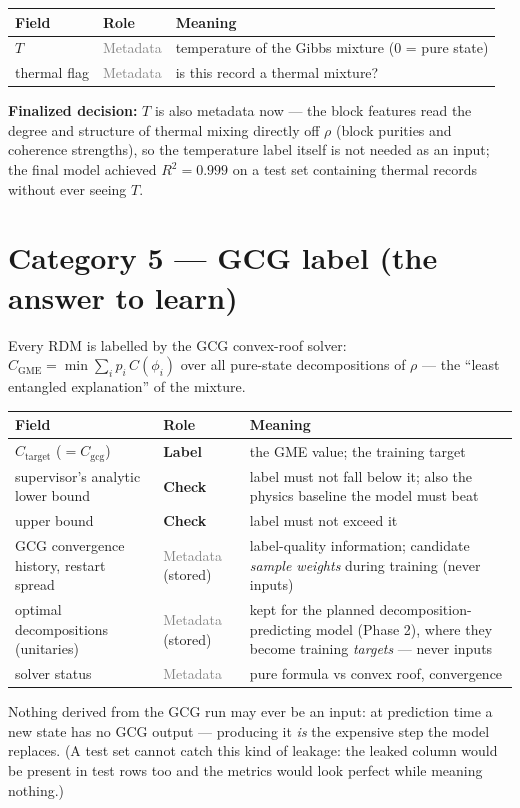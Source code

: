 \documentclass[11pt]{article}
\newcommand{\CGME}{\ensuremath{C_{\mathrm{GME}}}}
\newcommand{\lab}{\textcolor{red!60!black}{\textbf{Label}}}
\newcommand{\chk}{\textcolor{orange!70!black}{\textbf{Check}}}
\newcommand{\meta}{\textcolor{gray}{Metadata}}
\begin{document}
\begin{center}
\begin{tabular}{@{}llp{8.6cm}@{}}
\toprule
Field & Role & Meaning \\ \midrule
$T$            & \meta{} & temperature of the Gibbs mixture (0 = pure state) \\
thermal flag   & \meta{} & is this record a thermal mixture? \\
\bottomrule
\end{tabular}
\end{center}
\textbf{Finalized decision:} $T$ is also metadata now --- the block features
read the degree and structure of thermal mixing directly off $\rho$ (block
purities and coherence strengths), so the temperature label itself is not
needed as an input; the final model achieved $R^2=0.999$ on a test set
containing thermal records without ever seeing $T$.

\section{Category 5 --- GCG label (the answer to learn)}
Every RDM is labelled by the GCG convex-roof solver:
$\CGME=\min\sum_i p_i\,C(\phi_i)$ over all pure-state decompositions of
$\rho$ --- the ``least entangled explanation'' of the mixture.

\begin{center}
\begin{tabular}{@{}llp{8.2cm}@{}}
\toprule
Field & Role & Meaning \\ \midrule
$C_{\mathrm{target}}$ ($=C_{\mathrm{gcg}}$) & \lab{} & the GME value; the
  training target \\
supervisor's analytic lower bound & \chk{} & label must not fall below it;
  also the physics baseline the model must beat \\
upper bound          & \chk{} & label must not exceed it \\
GCG convergence history, restart spread & \meta{} (stored) & label-quality
  information; candidate \emph{sample weights} during training (never
  inputs) \\
optimal decompositions (unitaries) & \meta{} (stored) & kept for the planned
  decomposition-predicting model (Phase 2), where they become training
  \emph{targets} --- never inputs \\
solver status        & \meta{} & pure formula vs convex roof, convergence \\
\bottomrule
\end{tabular}
\end{center}
Nothing derived from the GCG run may ever be an input: at prediction time a
new state has no GCG output --- producing it \emph{is} the expensive step the
model replaces. (A test set cannot catch this kind of leakage: the leaked
column would be present in test rows too and the metrics would look perfect
while meaning nothing.)
\end{document}
